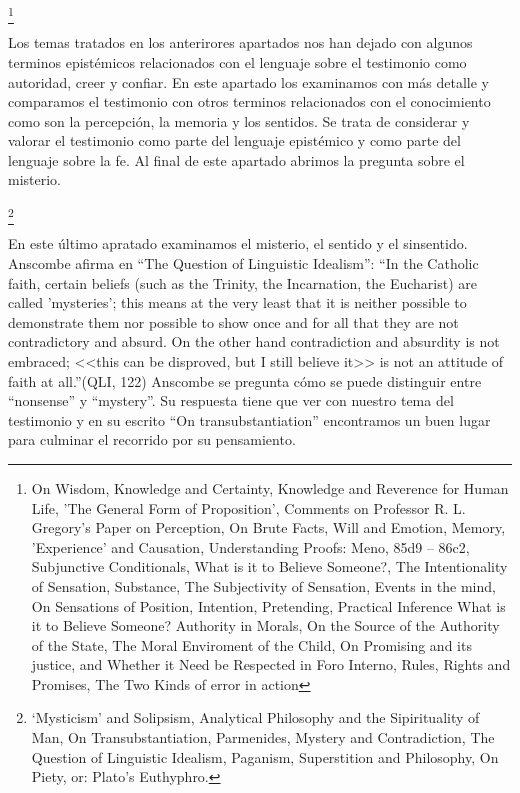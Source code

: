 \documentclass[11pt]{article}
\begin{document}
{\begin{spacing}{1.5}
\tab{}
\footnote{
On Wisdom, 
Knowledge and Certainty, 
Knowledge and Reverence for Human Life, 
'The General Form of Proposition', 
Comments on Professor R. L. Gregory's Paper on Perception, 
On Brute Facts, 
Will and Emotion, 
Memory, 'Experience' and Causation, 
Understanding Proofs: Meno, 85d9 – 86c2, 
Subjunctive Conditionals, 
What is it to Believe Someone?, 
The Intentionality of Sensation, 
Substance, 
The Subjectivity of Sensation, 
Events in the mind, 
On Sensations of Position, 
Intention, 
Pretending, 
Practical Inference
What is it to Believe Someone?
Authority in Morals, 
On the Source of the Authority of the State, 
The Moral Enviroment of the Child, 
On Promising and its justice, and Whether it Need be Respected in Foro Interno, 
Rules, Rights and Promises, 
The Two Kinds of error in action
}

\begin{spacing}{1}
Los temas tratados en los anterirores apartados nos han dejado con algunos terminos epistémicos relacionados con el lenguaje sobre el testimonio como autoridad, creer y confiar. En este apartado los examinamos con más detalle y comparamos el testimonio con otros terminos relacionados con el conocimiento como son la percepción, la memoria y los sentidos. Se trata de considerar y valorar el testimonio como parte del lenguaje epistémico y como parte del lenguaje sobre la fe. Al final de este apartado abrimos la pregunta sobre el misterio.
\end{spacing}

\tab{}
\footnote{
`Mysticism' and Solipsism, 
Analytical Philosophy and the Sipirituality of Man, 
On Transubstantiation, 
Parmenides, Mystery and Contradiction, 
The Question of Linguistic Idealism, 
Paganism, Superstition and Philosophy, 
On Piety, or: Plato's Euthyphro.
}

\begin{spacing}{1}
En este último apratado examinamos el misterio, el sentido y el sinsentido. Anscombe afirma en ``The Question of Linguistic Idealism'': ``In the Catholic faith, certain beliefs (such as the Trinity, the Incarnation, the Eucharist) are called 'mysteries'; this means at the very least that it is neither possible to demonstrate them nor possible to show once and for all that they are not contradictory and absurd. On the other hand contradiction and absurdity is not embraced; <<this can be disproved, but I still believe it>> is not an attitude of faith at all.''(QLI, 122) Anscombe se pregunta cómo se puede distinguir entre ``nonsense'' y ``mystery''. Su respuesta tiene que ver con nuestro tema del testimonio y en su escrito ``On transubstantiation'' encontramos un buen lugar para culminar el recorrido por su pensamiento.
\end{spacing}


\end{spacing}}
\end{document}
